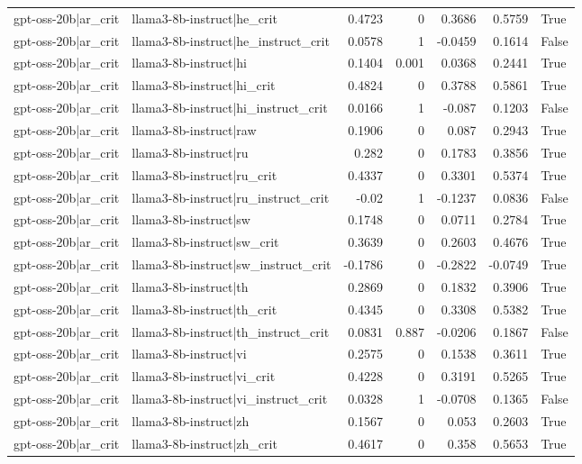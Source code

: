 \begin{table}
\begin{tabular}{l l r r r r l}
gpt-oss-20b|ar_crit & llama3-8b-instruct|he_crit & 0.4723 & 0 & 0.3686 & 0.5759 & True \\
gpt-oss-20b|ar_crit & llama3-8b-instruct|he_instruct_crit & 0.0578 & 1 & -0.0459 & 0.1614 & False \\
gpt-oss-20b|ar_crit & llama3-8b-instruct|hi & 0.1404 & 0.001 & 0.0368 & 0.2441 & True \\
gpt-oss-20b|ar_crit & llama3-8b-instruct|hi_crit & 0.4824 & 0 & 0.3788 & 0.5861 & True \\
gpt-oss-20b|ar_crit & llama3-8b-instruct|hi_instruct_crit & 0.0166 & 1 & -0.087 & 0.1203 & False \\
gpt-oss-20b|ar_crit & llama3-8b-instruct|raw & 0.1906 & 0 & 0.087 & 0.2943 & True \\
gpt-oss-20b|ar_crit & llama3-8b-instruct|ru & 0.282 & 0 & 0.1783 & 0.3856 & True \\
gpt-oss-20b|ar_crit & llama3-8b-instruct|ru_crit & 0.4337 & 0 & 0.3301 & 0.5374 & True \\
gpt-oss-20b|ar_crit & llama3-8b-instruct|ru_instruct_crit & -0.02 & 1 & -0.1237 & 0.0836 & False \\
gpt-oss-20b|ar_crit & llama3-8b-instruct|sw & 0.1748 & 0 & 0.0711 & 0.2784 & True \\
gpt-oss-20b|ar_crit & llama3-8b-instruct|sw_crit & 0.3639 & 0 & 0.2603 & 0.4676 & True \\
gpt-oss-20b|ar_crit & llama3-8b-instruct|sw_instruct_crit & -0.1786 & 0 & -0.2822 & -0.0749 & True \\
gpt-oss-20b|ar_crit & llama3-8b-instruct|th & 0.2869 & 0 & 0.1832 & 0.3906 & True \\
gpt-oss-20b|ar_crit & llama3-8b-instruct|th_crit & 0.4345 & 0 & 0.3308 & 0.5382 & True \\
gpt-oss-20b|ar_crit & llama3-8b-instruct|th_instruct_crit & 0.0831 & 0.887 & -0.0206 & 0.1867 & False \\
gpt-oss-20b|ar_crit & llama3-8b-instruct|vi & 0.2575 & 0 & 0.1538 & 0.3611 & True \\
gpt-oss-20b|ar_crit & llama3-8b-instruct|vi_crit & 0.4228 & 0 & 0.3191 & 0.5265 & True \\
gpt-oss-20b|ar_crit & llama3-8b-instruct|vi_instruct_crit & 0.0328 & 1 & -0.0708 & 0.1365 & False \\
gpt-oss-20b|ar_crit & llama3-8b-instruct|zh & 0.1567 & 0 & 0.053 & 0.2603 & True \\
gpt-oss-20b|ar_crit & llama3-8b-instruct|zh_crit & 0.4617 & 0 & 0.358 & 0.5653 & True \\

\end{tabular}
\end{table}
